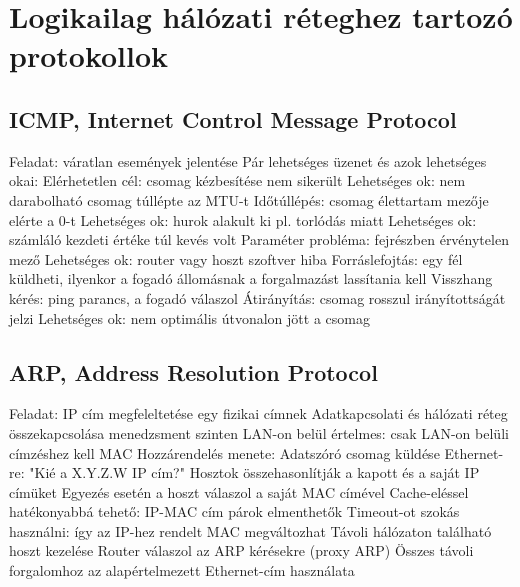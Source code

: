 \documentclass[12pt,a4paper]{article}
\begin{document}
\pagebreak

\section{Logikailag hálózati réteghez tartozó protokollok}

\subsection{ICMP, Internet Control Message Protocol}

\begin{outline}
	\1 Feladat: váratlan események jelentése
	\1 Pár lehetséges üzenet és azok lehetséges okai:
		\2 Elérhetetlen cél: csomag kézbesítése nem sikerült
			\3 Lehetséges ok: nem darabolható csomag túllépte az MTU-t
		\2 Időtúllépés: csomag élettartam mezője elérte a 0-t
			\3 Lehetséges ok: hurok alakult ki pl. torlódás miatt
			\3 Lehetséges ok: számláló kezdeti értéke túl kevés volt
		\2 Paraméter probléma: fejrészben érvénytelen mező
			\3 Lehetséges ok: router vagy hoszt szoftver hiba
		\2 Forráslefojtás: egy fél küldheti, ilyenkor a fogadó állomásnak a forgalmazást lassítania kell
		\2 Visszhang kérés: ping parancs, a fogadó válaszol
		\2 Átirányítás: csomag rosszul irányítottságát jelzi
			\3 Lehetséges ok: nem optimális útvonalon jött a csomag
\end{outline}

\subsection{ARP, Address Resolution Protocol}

\begin{outline}
	\1 Feladat: IP cím megfeleltetése egy fizikai címnek
		\2 Adatkapcsolati és hálózati réteg összekapcsolása menedzsment szinten
		\2 LAN-on belül értelmes: csak LAN-on belüli címzéshez kell MAC
	\1 Hozzárendelés menete:
		\2 Adatszóró csomag küldése Ethernet-re: "Kié a X.Y.Z.W IP cím?"
		\2 Hosztok összehasonlítják a kapott és a saját IP címüket
		\2 Egyezés esetén a hoszt válaszol a saját MAC címével
	\1 Cache-eléssel hatékonyabbá tehető: IP-MAC cím párok elmenthetők
		\2 Timeout-ot szokás használni: így az IP-hez rendelt MAC megváltozhat
	\1 Távoli hálózaton található hoszt kezelése
		\2 Router válaszol az ARP kérésekre (proxy ARP)
		\2 Összes távoli forgalomhoz az alapértelmezett Ethernet-cím használata
\end{outline}

\pagebreak
\end{document}
